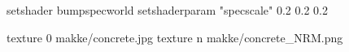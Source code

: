 setshader bumpspecworld
setshaderparam "specscale" 0.2 0.2 0.2

texture 0 makke/concrete.jpg
texture n makke/concrete_NRM.png
